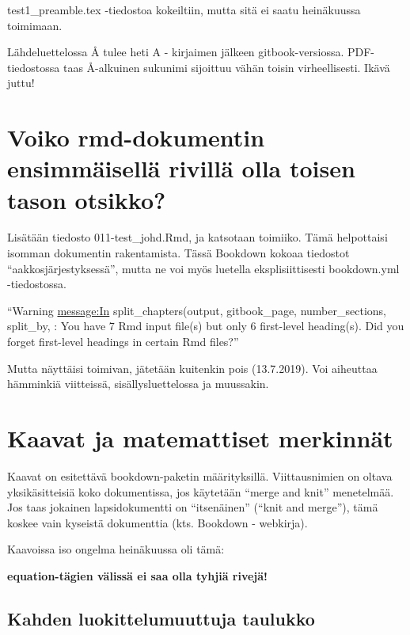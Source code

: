 \documentclass[
  finnish,
]{book}
\begin{document}
test1\_preamble.tex -tiedostoa kokeiltiin, mutta sitä ei saatu heinäkuussa toimimaan.

Lähdeluettelossa Å tulee heti A - kirjaimen jälkeen gitbook-versiossa. PDF-tiedostossa taas Å-alkuinen sukunimi sijoittuu vähän toisin virheellisesti. Ikävä juttu!

\hypertarget{voiko-rmd-dokumentin-ensimmuxe4iselluxe4-rivilluxe4-olla-toisen-tason-otsikko}{%
\chapter{Voiko rmd-dokumentin ensimmäisellä rivillä olla toisen tason otsikko?}\label{voiko-rmd-dokumentin-ensimmuxe4iselluxe4-rivilluxe4-olla-toisen-tason-otsikko}}

Lisätään tiedosto 011-test\_johd.Rmd, ja katsotaan toimiiko. Tämä helpottaisi
isomman dokumentin rakentamista. Tässä Bookdown kokoaa tiedostot ``aakkosjärjestyksessä'',
mutta ne voi myös luetella eksplisiittisesti bookdown.yml -tiedostossa.

``Warning \url{message:In} split\_chapters(output, gitbook\_page, number\_sections, split\_by, :
You have 7 Rmd input file(s) but only 6 first-level heading(s). Did you forget first-level headings in certain Rmd files?''

Mutta näyttäisi toimivan, jätetään kuitenkin pois (13.7.2019). Voi aiheuttaa hämminkiä viitteissä, sisällysluettelossa ja muussakin.

\hypertarget{kaavat-ja-matemattiset-merkinnuxe4t}{%
\chapter{Kaavat ja matemattiset merkinnät}\label{kaavat-ja-matemattiset-merkinnuxe4t}}

Kaavat on esitettävä bookdown-paketin määrityksillä. Viittausnimien on oltava yksikäsitteisiä koko dokumentissa, jos käytetään ``merge and knit'' menetelmää. Jos taas jokainen lapsidokumentti on ``itsenäinen'' (``knit and merge''), tämä koskee vain kyseistä dokumenttia (kts. Bookdown - webkirja).

Kaavoissa iso ongelma heinäkuussa oli tämä:

\textbf{equation-tägien välissä ei saa olla tyhjiä rivejä!}

\hypertarget{kahden-luokittelumuuttuja-taulukko}{%
\section{Kahden luokittelumuuttuja taulukko}\label{kahden-luokittelumuuttuja-taulukko}}
\end{document}
